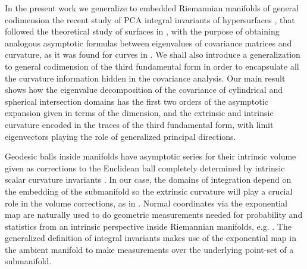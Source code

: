 \documentclass[letterpaper, reqno, 11pt]{amsart}
\theoremstyle{definition}
\theoremstyle{remark}
\numberwithin{equation}{section}
\begin{document}
In the present work we generalize to embedded Riemannian manifolds of general codimension the recent study of PCA integral invariants of hypersurfaces \cite{alvarez2018a}, that followed the theoretical study of surfaces in \cite{pottmann2007}, with the purpose of obtaining analogous asymptotic formulas between eigenvalues of covariance matrices and curvature, as it was found for curves in \cite{alvarez2017}. We shall also introduce a generalization to general codimension of the third fundamental form in order to encapsulate all the curvature information hidden in the covariance analysis. Our main result shows how the eigenvalue decomposition of the covariance of cylindrical and spherical intersection domains has the first two orders of the asymptotic expansion given in terms of the dimension, and the extrinsic and intrinsic curvature encoded in the traces of the third fundamental form, with limit eigenvectors playing the role of generalized principal directions.

Geodesic balls inside manifolds have asymptotic series for their intrinsic volume given as corrections to the Euclidean ball completely determined by intrinsic scalar curvature invariants \cite{gray1979}. In our case, the domains of integration depend on the embedding of the submanifold so the extrinsic curvature will play a crucial role in the volume corrections, as in \cite{hulin2003}. Normal coordinates via the exponential map are naturally used to do geometric measurements needed for probability and statistics from an intrinsic perspective inside Riemannian manifolds, e.g. \cite{pennec1999, pennec2006}. The generalized definition of integral invariants makes use of the exponential map in the ambient manifold to make measurements over the underlying point-set of a submanifold.
\end{document}

